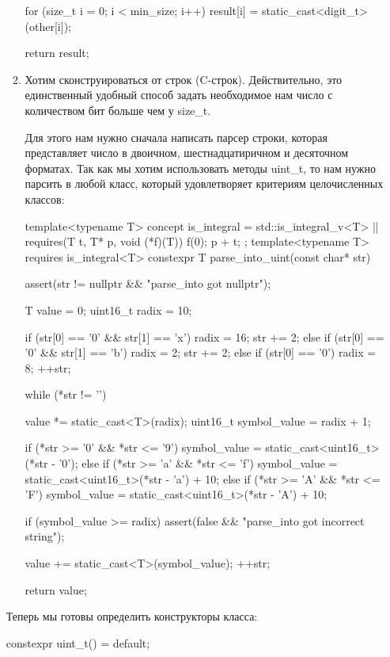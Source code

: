 \begin{itemize}
\begin{enumerate}
\begin{cppcode}
{    for (size_t i = 0; i < min_size; i++) {
        result[i] = static_cast<digit_t>(other[i]);
    }

    return result;
}
      \end{cppcode}
      \item Хотим сконструироваться от строк (C-строк). Действительно, это единственный удобный способ задать необходимое нам число с количеством бит больше чем у size\_t.

      Для этого нам нужно сначала написать парсер строки, которая представляет число в двоичном, шестнадцатиричном и десяточном форматах. Так как мы хотим использовать методы uint\_t, то нам нужно парсить в любой класс, который удовлетворяет критериям целочисленных классов:
      \begin{cppcode}
template<typename T>
concept is_integral = std::is_integral_v<T> || requires(T t, T* p, void (*f)(T)) {
    f(0);
    p + t;
};
template<typename T>
requires is_integral<T>
constexpr T parse_into_uint(const char* str) {
    assert(str != nullptr && "parse_into got nullptr");

    T value = 0;
    uint16_t radix = 10;

    if (str[0] == '0' && str[1] == 'x') {
        radix = 16;
        str += 2;
    } else if (str[0] == '0' && str[1] == 'b') {
        radix = 2;
        str += 2;
    } else if (str[0] == '0') {
        radix = 8;
        ++str;
    }

    while (*str != '\0') {
        value *= static_cast<T>(radix);
        uint16_t symbol_value = radix + 1;

        if (*str >= '0' && *str <= '9') {
            symbol_value = static_cast<uint16_t>(*str - '0');
        } else if (*str >= 'a' && *str <= 'f') {
            symbol_value = static_cast<uint16_t>(*str - 'a') + 10;
        } else if (*str >= 'A' && *str <= 'F') {
            symbol_value = static_cast<uint16_t>(*str - 'A') + 10;
        }

        if (symbol_value >= radix) {
            assert(false && "parse_into got incorrect string");
        }

        value += static_cast<T>(symbol_value);
        ++str;
    }

    return value;
}
      \end{cppcode}
    \end{enumerate}
    Теперь мы готовы определить конструкторы класса:
    \begin{cppcode}
constexpr uint_t() = default;


\end{cppcode}
\end{itemize}
